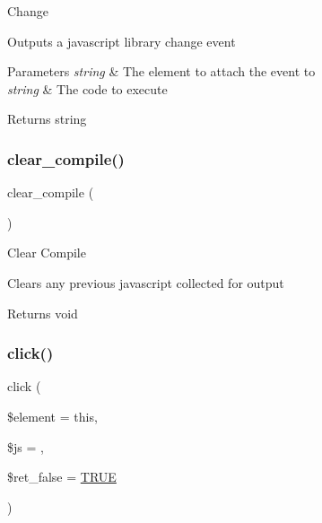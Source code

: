 Change

Outputs a javascript library change event


\begin{DoxyParams}{Parameters}
{\em string} & The element to attach the event to \\
\hline
{\em string} & The code to execute \\
\hline
\end{DoxyParams}
\begin{DoxyReturn}{Returns}
string 
\end{DoxyReturn}
\mbox{\label{class_c_i___javascript_a4e3a7e7ffc20e8f578a0d66f52def10d}} 
\subsubsection{\texorpdfstring{clear\+\_\+compile()}{clear\_compile()}}
{\footnotesize\ttfamily clear\+\_\+compile (\begin{DoxyParamCaption}{ }\end{DoxyParamCaption})}

Clear Compile

Clears any previous javascript collected for output

\begin{DoxyReturn}{Returns}
void 
\end{DoxyReturn}
\mbox{\label{class_c_i___javascript_a508491310edc8bcb766f0adc89ec24c4}} 
\subsubsection{\texorpdfstring{click()}{click()}}
{\footnotesize\ttfamily click (\begin{DoxyParamCaption}\item[{}]{\$element = {\ttfamily \textquotesingle{}this\textquotesingle{}},  }\item[{}]{\$js = {\ttfamily \textquotesingle{}\textquotesingle{}},  }\item[{}]{\$ret\+\_\+false = {\ttfamily \mbox{\hyperlink{constants_8php_ae04a3efe6aa42044f803ee90c2277846}{T\+R\+UE}}} }\end{DoxyParamCaption})}

